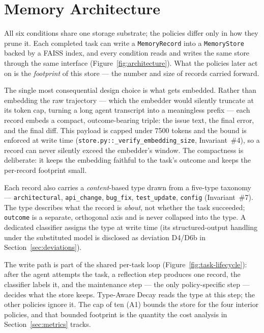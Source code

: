 

\section{Memory Architecture}

All six conditions share one storage substrate; the policies differ only in how they prune
it. Each completed task can write a \texttt{MemoryRecord} into a \texttt{MemoryStore} backed
by a FAISS index, and every condition reads and writes the same store through the same
interface (Figure~\ref{fig:architecture}). What the policies later act on is the
\emph{footprint} of this store --- the number and size of records carried forward.

The single most consequential design choice is what gets embedded. Rather than embedding the
raw trajectory --- which the embedder would silently truncate at its token cap, turning a
long agent transcript into a meaningless prefix --- each record embeds a compact,
outcome-bearing triple: the issue text, the final error, and the final diff. This payload is
capped under 7500 tokens and the bound is enforced at write time
(\texttt{store.py::\_verify\_embedding\_size}, Invariant~\#4), so a record can never silently
exceed the embedder's window. The compactness is deliberate: it keeps the embedding faithful
to the task's outcome and keeps the per-record footprint small.

Each record also carries a \emph{content}-based type drawn from a five-type taxonomy ---
\texttt{architectural}, \texttt{api\_change}, \texttt{bug\_fix}, \texttt{test\_update},
\texttt{config} (Invariant~\#7). The type describes what the record is \emph{about}, not
whether the task succeeded; \texttt{outcome} is a separate, orthogonal axis and is never
collapsed into the type. A dedicated classifier assigns the type at write time (its
structured-output handling under the substituted model is disclosed as deviation D4/D6b in
Section~\ref{sec:deviations}).

The write path is part of the shared per-task loop (Figure~\ref{fig:task-lifecycle}): after
the agent attempts the task, a reflection step produces one record, the classifier labels
it, and the maintenance step --- the only policy-specific step --- decides what the store
keeps. Type-Aware Decay reads the type at this step; the other policies ignore it. The cap of
ten (A1) bounds the store for the four interior policies, and that bounded footprint is the
quantity the cost analysis in Section~\ref{sec:metrics} tracks.
